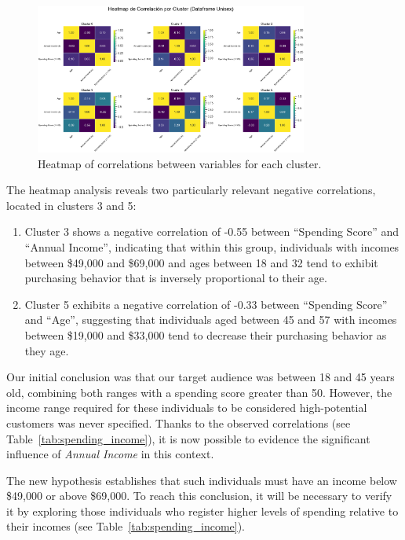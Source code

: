 \documentclass[10pt]{article}
\begin{document}
\begin{figure}[h]
    \centering
    \includegraphics[width=0.8\textwidth]{plots_investing/Grafico 10.png}
    \caption{Heatmap of correlations between variables for each cluster.}
    \label{fig:miGrafico10}
\end{figure}

The heatmap analysis reveals two particularly relevant negative correlations, located in clusters 3 and 5:
\begin{enumerate}
    \item Cluster 3 shows a negative correlation of -0.55 between “Spending Score” and “Annual Income”, indicating that within this group, individuals with incomes between \$49,000 and \$69,000 and ages between 18 and 32 tend to exhibit purchasing behavior that is inversely proportional to their age.
    \item Cluster 5 exhibits a negative correlation of -0.33 between “Spending Score” and “Age”, suggesting that individuals aged between 45 and 57 with incomes between \$19,000 and \$33,000 tend to decrease their purchasing behavior as they age.
\end{enumerate}

Our initial conclusion was that our target audience was between 18 and 45 years old, combining both ranges with a spending score greater than 50. However, the income range required for these individuals to be considered high-potential customers was never specified. Thanks to the observed correlations (see Table~\ref{tab:spending_income}), it is now possible to evidence the significant influence of \emph{Annual Income} in this context.

The new hypothesis establishes that such individuals must have an income below \$49,000 or above \$69,000. To reach this conclusion, it will be necessary to verify it by exploring those individuals who register higher levels of spending relative to their incomes (see Table~\ref{tab:spending_income}).
\end{document}
